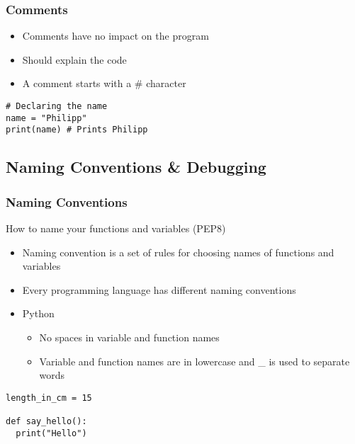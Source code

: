 \documentclass[10pt, a4paper]{beamer} %
\begin{document}
\begin{frame}[c, fragile]\frametitle{Comments}
	\begin{itemize}
		\item Comments have no impact on the program
		\item Should explain the code
		\item A comment starts with a \# character
	\end{itemize}

	\begin{examples}
		\begin{lstlisting}
# Declaring the name
name = "Philipp"
print(name) # Prints Philipp
  \end{lstlisting}
	\end{examples}



\end{frame}



\subsection{Naming Conventions \& Debugging} %
\label{sub:naming_conventions_&_debugging}
\begin{frame}\frametitle{Naming Conventions}
	\begin{block}{How to name your functions and variables (PEP8)}
		\begin{itemize}
			\item Naming convention is a set of rules for choosing names of functions and variables
			\item Every programming language has different naming conventions
			\item Python
			      \begin{itemize}
				      \item No spaces in variable and function names
				      \item Variable and function names are in lowercase and \_ is used to separate words
			      \end{itemize}
		\end{itemize}

		\begin{lstlisting}
length_in_cm = 15

def say_hello():
  print("Hello")
\end{lstlisting}
	\end{block}
\end{frame}
\end{document}
